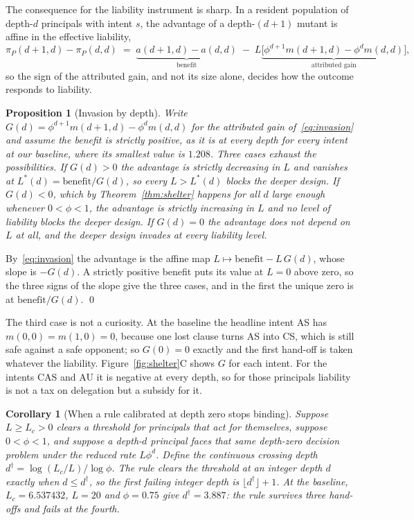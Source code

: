 \documentclass[a4paper,fleqn]{cas-sc}
\newtheorem{proposition}[theorem]{Proposition}
\newtheorem{corollary}[theorem]{Corollary}
\newcommand{\AS}{\textsf{AS}}
\newcommand{\CS}{\textsf{CS}}
\newcommand{\CAS}{\textsf{CAS}}
\newcommand{\AU}{\textsf{AU}}
\newcommand{\piP}{\pi_{P}}
\begin{document}
The consequence for the liability instrument is sharp. In a resident population
of depth-$d$ principals with intent $s$, the advantage of a depth-$(d+1)$
mutant is affine in the effective liability,
\begin{equation}
  \piP(d{+}1,d)-\piP(d,d)
  \;=\; \underbrace{a(d{+}1,d)-a(d,d)}_{\text{benefit}}
  \;-\; L\underbrace{\bigl[\phi^{d+1}m(d{+}1,d)-\phi^{d}m(d,d)\bigr]}_{\text{attributed gain}},
  \label{eq:invasion}
\end{equation}
so the sign of the attributed gain, and not its size alone, decides how the
outcome responds to liability.

\begin{proposition}[Invasion by depth]
\label{prop:invasion}
Write $G(d)=\phi^{d+1}m(d{+}1,d)-\phi^{d}m(d,d)$ for the attributed gain
of~\eqref{eq:invasion} and assume the benefit is strictly positive, as it is at
every depth for every intent at our baseline, where its smallest value is
$1.208$. Three cases exhaust the possibilities. If $G(d)>0$ the advantage is
strictly decreasing in $L$ and vanishes at
$L^{*}(d)=\text{benefit}/G(d)$, so every $L>L^{*}(d)$ blocks the deeper design.
If $G(d)<0$, which by Theorem~\ref{thm:shelter} happens for all $d$ large
enough whenever $0<\phi<1$, the advantage is strictly increasing in $L$ and no
level of liability blocks the deeper design. If $G(d)=0$ the advantage does not
depend on $L$ at all, and the deeper design invades at every liability level.
\end{proposition}

\begin{pf}
By~\eqref{eq:invasion} the advantage is the affine map
$L\mapsto\text{benefit}-L\,G(d)$, whose slope is $-G(d)$. A strictly positive
benefit puts its value at $L=0$ above zero, so the three signs of the slope give
the three cases, and in the first the unique zero is at
$\text{benefit}/G(d)$.
\qed
\end{pf}

The third case is not a curiosity. At the baseline the headline intent \AS{}
has $m(0,0)=m(1,0)=0$, because one lost clause turns \AS{} into \CS{}, which is
still safe against a safe opponent; so $G(0)=0$ exactly and the first hand-off
is taken whatever the liability. Figure~\ref{fig:shelter}C shows $G$ for each
intent. For the intents \CAS{} and \AU{} it is negative at every depth, so for
those principals liability is not a tax on delegation but a subsidy for it.

\begin{corollary}[When a rule calibrated at depth zero stops binding]
\label{cor:failure}
Suppose $L\ge L_c>0$ clears a threshold for principals that act for themselves,
suppose $0<\phi<1$, and suppose a depth-$d$ principal faces that same depth-zero
decision problem under the reduced rate $L\phi^{d}$. Define the continuous
crossing depth $d^{\dagger}=\log(L_{c}/L)/\log\phi$. The rule clears the
threshold at an integer depth $d$ exactly when $d\le d^{\dagger}$, so the first
failing integer depth is $\lfloor d^{\dagger}\rfloor+1$. At the baseline,
$L_{c}=6.537432$, $L=20$ and $\phi=0.75$ give $d^{\dagger}=3.887$: the rule
survives three hand-offs and fails at the fourth.
\end{corollary}
\end{document}
